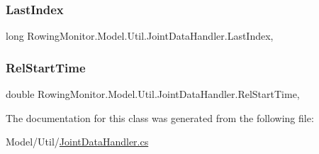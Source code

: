 \subsubsection{\texorpdfstring{Last\+Index}{LastIndex}}
{\footnotesize\ttfamily long Rowing\+Monitor.\+Model.\+Util.\+Joint\+Data\+Handler.\+Last\+Index\hspace{0.3cm}{\ttfamily [get]}, {\ttfamily [set]}}

\mbox{\label{class_rowing_monitor_1_1_model_1_1_util_1_1_joint_data_handler_a6a861fd29d1f7d9e5257d2b4fd995e7d}} 
\subsubsection{\texorpdfstring{Rel\+Start\+Time}{RelStartTime}}
{\footnotesize\ttfamily double Rowing\+Monitor.\+Model.\+Util.\+Joint\+Data\+Handler.\+Rel\+Start\+Time\hspace{0.3cm}{\ttfamily [get]}, {\ttfamily [set]}}



The documentation for this class was generated from the following file\+:\begin{DoxyCompactItemize}
\item 
Model/\+Util/\hyperlink{_joint_data_handler_8cs}{Joint\+Data\+Handler.\+cs}\end{DoxyCompactItemize}
